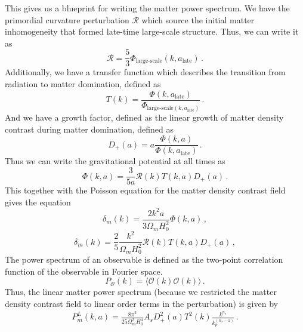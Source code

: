 This gives us a blueprint for writing the matter power spectrum. We have the primordial curvature perturbation $\mathcal{R}$ which source the initial matter inhomogeneity that formed late-time large-scale structure. Thus, we can write it as
\begin{equation}
	\mathcal{R} = \frac{5}{3}\Phi_{\text{large-scale}}(k,a_{\text{late}})\,.
\end{equation} 
Additionally, we have a transfer function which describes the transition from radiation to matter domination, defined as
\begin{equation}
	T(k) = \frac{\Phi(k,a_{\text{late}})}{\Phi_{\text{large-scale}(k,a_{\text{late}})}}\,.
\end{equation}
And we have a growth factor, defined as the linear growth of matter density contrast during matter domination, defined as
\begin{equation}
	D_+(a) = a \frac{\Phi(k,a)}{\Phi(k,a_{\text{late}})}\,.
\end{equation}
Thus we can write the gravitational potential at all times as
\begin{equation}
	\Phi(k,a) = \frac{3}{5a}\mathcal{R}(k)T(k,a)D_+(a)\,.
\end{equation}
This together with the Poisson equation for the matter density contrast field gives the equation
\begin{equation}
	\delta_m(k) = \frac{2k^2a}{3\Omega_mH_0^2}\Phi(k,a)\,,
\end{equation}
\begin{equation}
	\delta_m(k) = \frac{2}{5}\frac{k^2}{\Omega_mH_0^2}\mathcal{R}(k)T(k,a)D_+(a)\,,
\end{equation}
The power spectrum of an observable is defined as the two-point correlation function of the observable in Fourier space.
\begin{equation}
	P_\mathcal{O}(k) = \langle \mathcal{O}(k)\mathcal{O}(k) \rangle\,.
\end{equation}
Thus, the linear matter power spectrum (because we restricted the matter density contrast field to linear order terms in the perturbation) is given by
\begin{equation}
	\begin{split}
		P_m^{L}(k,a) = \frac{8\pi^2}{25 \Omega_m^2 H_0^4} A_s D_+^2(a)T^2(k)\frac{k^{n_s}}{k_p^{(n_s-1)}}\,.
	\end{split}
\end{equation}

